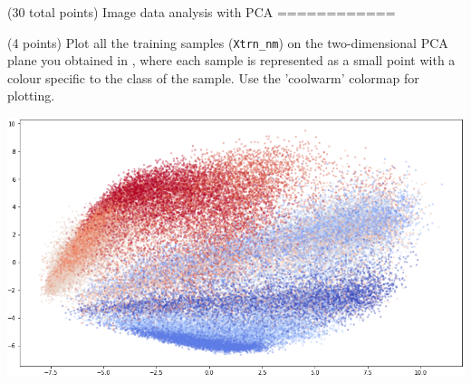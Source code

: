 \documentclass[12pt]{article}
\begin{document}
\begin{question}{(30 total points) Image data analysis with PCA}
============
   \begin{subquestion}{(4 points)
       Plot all the training samples (\texttt{Xtrn\_nm}) on the
       two-dimensional PCA plane you obtained in , where each sample is
       represented as a small point with a colour specific to the class of
       the sample.  Use the 'coolwarm' colormap for plotting.
     } \label{Q1.8}


   

      \begin{answerbox}{40em}
         \begin{center}
	\includegraphics[width=\textwidth]{imgs/1_8.png}
	\end{center}
      \end{answerbox}
  


   \end{subquestion}
   

\end{question}
\clearpage
%
%
\end{document}
